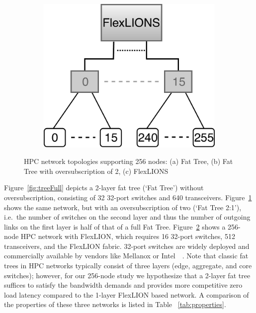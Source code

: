 \begin{figure}[t!]
\begin{subfigure}[t]{0.28\linewidth}
        \caption{}
        		\label{fig:treeHalf}
    \end{subfigure}
    \hspace{0.5cm}
    \begin{subfigure}[t]{0.28\linewidth}
        \includegraphics[width=\textwidth, clip]{Figures/flexlionIncenter.pdf}
        \caption{}
        		\label{fig:flexlionIncenter}
       \end{subfigure}
    \caption[]{HPC network topologies supporting 256 nodes: (a) Fat Tree, (b) Fat Tree with oversubscription of 2, (c) FlexLIONS}
    \label{fig:networktopologies}
\end{figure}
Figure~\ref{fig:treeFull} depicts a 2-layer fat tree (`Fat Tree') without oversubscription, consisting of 32 32-port switches and 640 transceivers. Figure~\ref{fig:treeHalf} shows the same network, but with an oversubscription of two (`Fat Tree 2:1'), i.e.\ the number of switches on the second layer and thus the number of outgoing links on the first layer is half of that of a full Fat Tree. Figure~\ref{fig:flexlionIncenter} shows a 256-node HPC network with FlexLION, which requires 16 32-port switches, 512 transceivers, and the FlexLION fabric. 32-port switches are widely deployed and commercially available by vendors like Mellanox or Intel~\cite{mellanox}~\cite{intelomnipath}. Note that classic fat trees in HPC networks typically consist of three layers (edge, aggregate, and core switches); however, for our 256-node study we hypothesize that a 2-layer fat tree suffices to satisfy the bandwidth demands and provides more competitive zero load latency compared to the 1-layer FlexLION based network. A comparison of the properties of these three networks is listed in Table ~\ref{tab:properties}. \\
